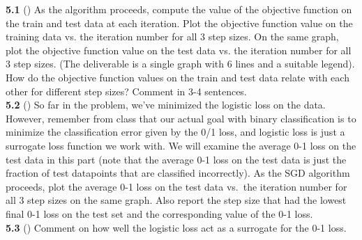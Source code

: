\textbf{5.1} () As the algorithm proceeds, compute the value of the objective function on the train and test data at each iteration. Plot the objective function value on the training data vs. the iteration number for all 3 step sizes. On the same graph, plot the objective function value on the test data vs. the iteration number for all 3 step sizes. (The deliverable is a single graph with 6 lines and a suitable legend). How do the objective function values on the train and test data relate with each other for different step sizes? Comment in 3-4 sentences.\\

\textbf{5.2} () So far in the problem, we've minimized the logistic loss on the data. However, remember from class that our actual goal with binary classification is to minimize the classification error given by the 0/1 loss, and logistic loss is just a surrogate loss function we work with. We will examine the average 0-1 loss on the test data in this part (note that the average 0-1 loss on the test data is just the fraction of test datapoints that are classified incorrectly). As the SGD algorithm proceeds, plot the average 0-1 loss on the test data vs.\ the iteration number for all 3 step sizes on the same graph. Also report the step size that had the lowest final 0-1 loss on the test set and the corresponding value of the 0-1 loss.\\

\textbf{5.3} () Comment on how well the logistic loss act as a surrogate for the 0-1 loss.\\

